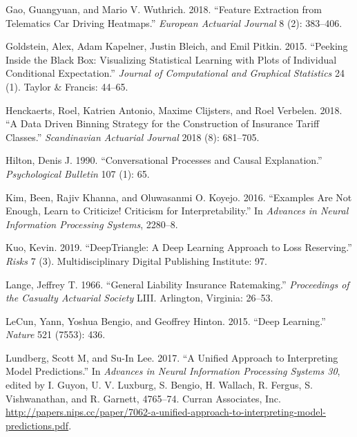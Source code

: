 \documentclass[preprint, 3p, twocolumn, letterpaper, 10pt]{elsarticle} %
\begin{document}
\leavevmode\hypertarget{ref-gao_2018_2}{}%
Gao, Guangyuan, and Mario V. Wuthrich. 2018. ``Feature Extraction from Telematics Car Driving Heatmaps.'' \emph{European Actuarial Journal} 8 (2): 383--406.

\leavevmode\hypertarget{ref-goldstein2015peeking}{}%
Goldstein, Alex, Adam Kapelner, Justin Bleich, and Emil Pitkin. 2015. ``Peeking Inside the Black Box: Visualizing Statistical Learning with Plots of Individual Conditional Expectation.'' \emph{Journal of Computational and Graphical Statistics} 24 (1). Taylor \& Francis: 44--65.

\leavevmode\hypertarget{ref-henckaerts_2018}{}%
Henckaerts, Roel, Katrien Antonio, Maxime Clijsters, and Roel Verbelen. 2018. ``A Data Driven Binning Strategy for the Construction of Insurance Tariff Classes.'' \emph{Scandinavian Actuarial Journal} 2018 (8): 681--705.

\leavevmode\hypertarget{ref-hiltonConversationalProcesses1990}{}%
Hilton, Denis J. 1990. ``Conversational Processes and Causal Explanation.'' \emph{Psychological Bulletin} 107 (1): 65.

\leavevmode\hypertarget{ref-kimExamplesAre2016}{}%
Kim, Been, Rajiv Khanna, and Oluwasanmi O. Koyejo. 2016. ``Examples Are Not Enough, Learn to Criticize! Criticism for Interpretability.'' In \emph{Advances in Neural Information Processing Systems}, 2280--8.

\leavevmode\hypertarget{ref-kuoDeepTriangleDeep2018}{}%
Kuo, Kevin. 2019. ``DeepTriangle: A Deep Learning Approach to Loss Reserving.'' \emph{Risks} 7 (3). Multidisciplinary Digital Publishing Institute: 97.

\leavevmode\hypertarget{ref-lange_1966}{}%
Lange, Jeffrey T. 1966. ``General Liability Insurance Ratemaking.'' \emph{Proceedings of the Casualty Actuarial Society} LIII. Arlington, Virginia: 26--53.

\leavevmode\hypertarget{ref-lecunDeepLearning2015}{}%
LeCun, Yann, Yoshua Bengio, and Geoffrey Hinton. 2015. ``Deep Learning.'' \emph{Nature} 521 (7553): 436.

\leavevmode\hypertarget{ref-NIPS2017_7062}{}%
Lundberg, Scott M, and Su-In Lee. 2017. ``A Unified Approach to Interpreting Model Predictions.'' In \emph{Advances in Neural Information Processing Systems 30}, edited by I. Guyon, U. V. Luxburg, S. Bengio, H. Wallach, R. Fergus, S. Vishwanathan, and R. Garnett, 4765--74. Curran Associates, Inc. \url{http://papers.nips.cc/paper/7062-a-unified-approach-to-interpreting-model-predictions.pdf}.
\end{document}
